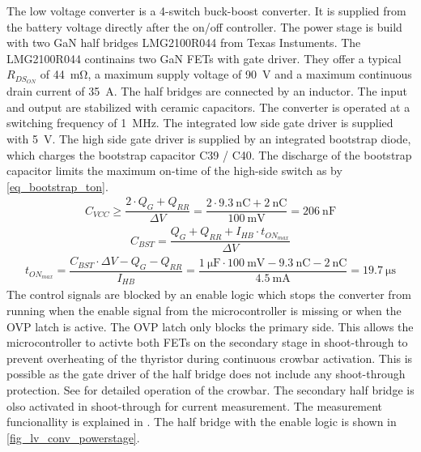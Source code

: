 The low voltage converter is a 4-switch buck-boost converter. It is supplied from the battery voltage directly after the on/off controller. The power stage is build with two \ac{GaN} half bridges LMG2100R044 from Texas Instuments. The LMG2100R044 continains two \ac{GaN} \acp{FET} with gate driver. They offer a typical $R_{DS_{ON}}$ of \qty{44}{\milli\ohm}, a maximum supply voltage of \qty{90}{\volt} and a maximum continuous drain current of \qty{35}{\ampere}. The half bridges are connected by an inductor. The input and output are stabilized with ceramic capacitors. The converter is operated at a switching frequency of \qty{1}{\mega\hertz}. 
The integrated low side gate driver is supplied with \qty{5}{\volt}. The high side gate driver is supplied by an integrated bootstrap diode, which charges the bootstrap capacitor C39 / C40. The discharge of the bootstrap capacitor limits the maximum on-time of the high-side switch as by \autoref{eq_bootstrap_ton}. 
\begin{align}
    \label{eq_lv_conv_sup_bypass}
    C_{VCC} 
    \geq \dfrac{2 \cdot Q_{G} + Q_{RR}}{\Delta V} 
    = \dfrac{2 \cdot \qty{9.3}{\nano\coulomb} + \qty{2}{\nano\coulomb}}{\qty{100}{\milli\volt}} 
    = \qty{206}{\nano\farad}
\end{align}
\begin{align}
    \label{eq_bootstrap}
    C_{BST} = \dfrac{Q_{G} + Q_{RR} + I_{HB} \cdot t_{ON_{max}}}{\Delta V}
\end{align}
\begin{align}
    \label{eq_bootstrap}
    t_{ON_{max}} 
    = \dfrac{C_{BST} \cdot \Delta V - Q_{G} - Q_{RR}}{I_{HB}}
    = \dfrac{\qty{1}{\micro\farad} \cdot \qty{100}{\milli\volt} - \qty{9.3}{\nano\coulomb} - \qty{2}{\nano\coulomb}}{\qty{4.5}{\milli\ampere}}
    = \qty{19.7}{\micro\second}
\end{align}
The control signals are blocked by an enable logic which stops the converter from running when the enable signal from the microcontroller is missing or when the \ac{OVP} latch is active. The \ac{OVP} latch only blocks the primary side. This allows the microcontroller to activte both \acp{FET} on the secondary stage in shoot-through to prevent overheating of the thyristor during continuous crowbar activation. This is possible as the gate driver of the half bridge does not include any shoot-through protection. See  for detailed operation of the crowbar. The secondary half bridge is olso activated in shoot-through for current measurement. The measurement funcionallity is explained in . The half bridge with the enable logic is shown in \autoref{fig_lv_conv_powerstage}. 

